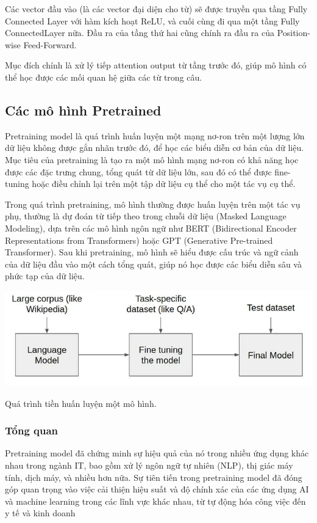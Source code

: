 \documentclass[a4paper, 12pt, openany]{book}
\begin{document}
Các vector đầu vào (là các vector đại diện cho từ) sẽ được truyền qua tầng Fully Connected Layer với hàm kích hoạt ReLU, và cuối cùng đi qua một tầng Fully ConnectedLayer nữa.
Đầu ra của tầng thứ hai cũng chính ra đầu ra của Position-wise Feed-Forward.

Mục đích chính là xử lý tiếp attention output từ tầng trước đó, giúp mô hình có thể học được các mối quan hệ giữa các từ trong câu.

\subsection{Các mô hình Pretrained}

Pretraining model là quá trình huấn luyện một mạng nơ-ron trên một lượng lớn dữ liệu không được gắn nhãn trước đó, để học các biểu diễn cơ bản của dữ liệu. 
Mục tiêu của pretraining là tạo ra một mô hình mạng nơ-ron có khả năng học được các đặc trưng chung, tổng quát từ dữ liệu lớn, sau đó có thể được fine-tuning hoặc điều chỉnh lại trên một tập dữ liệu cụ thể cho một tác vụ cụ thể. 

Trong quá trình pretraining, mô hình thường được huấn luyện trên một tác vụ phụ, thường là dự đoán từ tiếp theo trong chuỗi dữ liệu (Masked Language Modeling), dựa trên các mô hình ngôn ngữ như BERT (Bidirectional Encoder Representations from Transformers) hoặc GPT (Generative Pre-trained Transformer). 
Sau khi pretraining, mô hình sẽ hiểu được cấu trúc và ngữ cảnh của dữ liệu đầu vào một cách tổng quát, giúp nó học được các biểu diễn sâu và phức tạp của dữ liệu.

\begin{minipage}{\linewidth}
    \captionsetup{type=figure}
    \centering
    \includegraphics[width=.6\linewidth]{./assets/images/pre-train.jpeg}
    \caption{Quá trình tiền huấn luyện một mô hình.}
\end{minipage}

\subsubsection{Tổng quan}

Pretraining model đã chứng minh sự hiệu quả của nó trong nhiều ứng dụng khác nhau trong ngành IT, bao gồm xử lý ngôn ngữ tự nhiên (NLP), thị giác máy tính, dịch máy, và nhiều hơn nữa. Sự tiên tiến trong pretraining model đã đóng góp quan trọng vào việc cải thiện hiệu suất và độ chính xác của các ứng dụng AI và machine learning trong các lĩnh vực khác nhau, từ tự động hóa công việc đến y tế và kinh doanh
\end{document}
